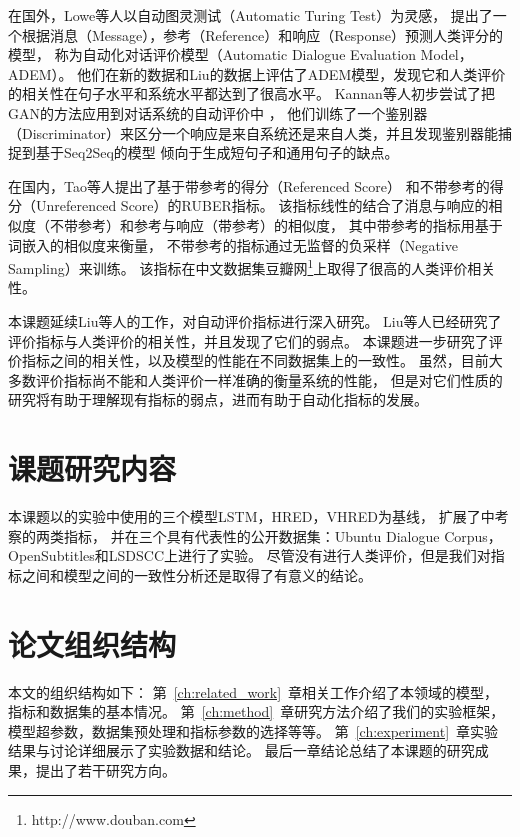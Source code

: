 在国外，Lowe等人以自动图灵测试（Automatic Turing Test）为灵感，
提出了一个根据消息（Message），参考（Reference）和响应（Response）预测人类评分的模型，
称为自动化对话评价模型（Automatic Dialogue Evaluation Model，ADEM）。
他们在新的数据和Liu的数据上评估了ADEM模型，发现它和人类评价的相关性在句子水平和系统水平都达到了很高水平。
Kannan等人初步尝试了把GAN的方法应用到对话系统的自动评价中
，
他们训练了一个鉴别器（Discriminator）来区分一个响应是来自系统还是来自人类，并且发现鉴别器能捕捉到基于Seq2Seq的模型
倾向于生成短句子和通用句子的缺点。


在国内，Tao等人提出了基于带参考的得分（Referenced Score）
和不带参考的得分（Unreferenced Score）的RUBER指标。
该指标线性的结合了消息与响应的相似度（不带参考）和参考与响应（带参考）的相似度，
其中带参考的指标用基于词嵌入的相似度来衡量，
不带参考的指标通过无监督的负采样（Negative Sampling）来训练。
该指标在中文数据集豆瓣网\footnote{http://www.douban.com}上取得了很高的人类评价相关性。

本课题延续Liu等人的工作，对自动评价指标进行深入研究。
Liu等人已经研究了评价指标与人类评价的相关性，并且发现了它们的弱点。
本课题进一步研究了评价指标之间的相关性，以及模型的性能在不同数据集上的一致性。
虽然，目前大多数评价指标尚不能和人类评价一样准确的衡量系统的性能，
但是对它们性质的研究将有助于理解现有指标的弱点，进而有助于自动化指标的发展。

\section{课题研究内容}\label{sec:reseach_content}
本课题以\cite{VHRED}的实验中使用的三个模型LSTM，HRED，VHRED为基线，
扩展了\cite{HowNot}中考察的两类指标，
并在三个具有代表性的公开数据集：Ubuntu Dialogue Corpus，OpenSubtitles和LSDSCC上进行了实验。
尽管没有进行人类评价，但是我们对指标之间和模型之间的一致性分析还是取得了有意义的结论。

\section{论文组织结构}\label{sec:paper_organization}
本文的组织结构如下：
第~\ref{ch:related_work}~章相关工作介绍了本领域的模型，指标和数据集的基本情况。
第~\ref{ch:method}~章研究方法介绍了我们的实验框架，模型超参数，数据集预处理和指标参数的选择等等。
第~\ref{ch:experiment}~章实验结果与讨论详细展示了实验数据和结论。
最后一章结论总结了本课题的研究成果，提出了若干研究方向。

